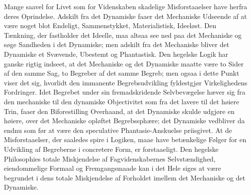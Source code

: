 \documentclass[12pt]{book}
\newcommand{\opage}[1]{\marginnote{\footnotesize\textit{[#1]}}}
\begin{document}
Mange saavel for Livet som for Videnskaben skadelige Misforstaaelser have herfra deres
Oprindelse. Adskilt fra det Dynamiske faaer det Mechaniske Udseende af at være noget blot
Endeligt, Sammenstykket, Materialistisk, Ideeløst. Den Tænkning, der fastholder det
Ideelle, maa altsaa see ned paa det Mechaniske og søge Sandheden i det Dynamiske; men
adskilt fra det Mechaniske bliver det Dynamiske et Svævende, Ubestemt og Phantastisk. Den
hegelske Logik har ganske rigtig indseet, at det Mechaniske og det Dynamiske maatte være
to Sider af den samme Sag, to Begreber af det samme Begreb; men ogsaa i dette Punkt viser
det sig, hvorlidt den immanente Begrebsudvikling fyldestgjør Virkelighedens Fordringer.
Idet Begrebet under sin fremadskridende Selvbevægelse hæver sig fra den mechaniske til den
dynamiske Objectivitet som fra det lavere til det høiere Trin, faaer den Biforestilling
Overhaand, at det Dynamiske skulde udgjøre en høiere, over det Mechaniske opløftet
Begrebssphære; det Dynamiske vedbliver da endnu som før at være den speculative
Phantasie-Anskuelse priisgivet. At de Misforstaaelser, der saaledes spire i Logiken, maae
have betænkelige Følger for en Udvikling af Begreberne i concretere Form, er forstaaeligt.
Den hegelske Philosophies totale Miskjendelse af Fagvidenskabernes Selvstændighed,
eiendommelige Formaal og Fremgangsmaade kan i det Hele siges at
\opage{355} være begrundet i dens totale Miskjendelse af Forholdet imellem det Mechaniske og det
Dynamiske.
\end{document}
